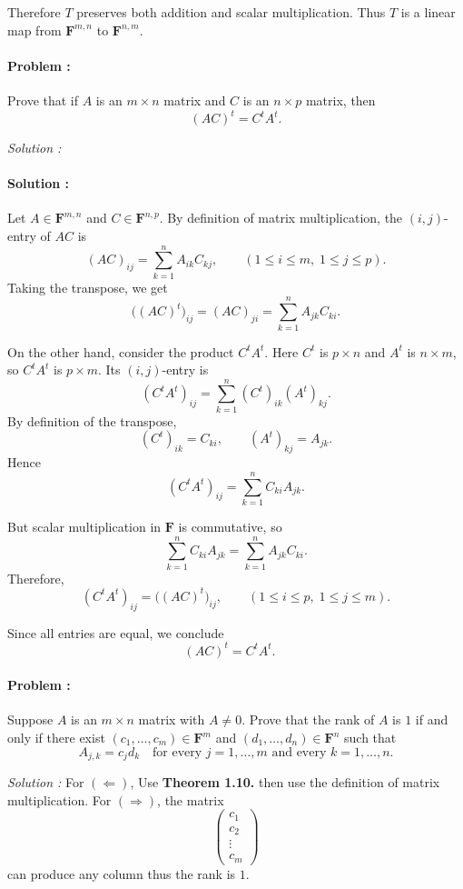 Therefore \(T\) preserves both addition and scalar multiplication.  
Thus \(T\) is a linear map from \(\mathbf{F}^{m,n}\) to \(\mathbf{F}^{n,m}\).

\paragraph{Problem :}
Prove that if \(A\) is an \(m \times n\) matrix and \(C\) is an \(n \times p\) matrix, then
\[
(AC)^t = C^t A^t.
\]

\vspace{4mm}
\textit{Solution :} 
\paragraph{Solution :}
Let \(A \in \mathbf{F}^{m,n}\) and \(C \in \mathbf{F}^{n,p}\).  
By definition of matrix multiplication, the \((i,j)\)-entry of \(AC\) is
\[
(AC)_{ij} = \sum_{k=1}^n A_{ik} C_{kj}, \qquad (1 \leq i \leq m, \; 1 \leq j \leq p).
\]
Taking the transpose, we get
\[
\big((AC)^t\big)_{ij} = (AC)_{ji} 
= \sum_{k=1}^n A_{jk} C_{ki}.
\]

On the other hand, consider the product \(C^t A^t\).  
Here \(C^t\) is \(p \times n\) and \(A^t\) is \(n \times m\), so \(C^t A^t\) is \(p \times m\).  
Its \((i,j)\)-entry is
\[
(C^t A^t)_{ij} = \sum_{k=1}^n (C^t)_{ik} (A^t)_{kj}.
\]
By definition of the transpose,
\[
(C^t)_{ik} = C_{ki}, \qquad (A^t)_{kj} = A_{jk}.
\]
Hence
\[
(C^t A^t)_{ij} = \sum_{k=1}^n C_{ki} A_{jk}.
\]

But scalar multiplication in \(\mathbf{F}\) is commutative, so
\[
\sum_{k=1}^n C_{ki} A_{jk} = \sum_{k=1}^n A_{jk} C_{ki}.
\]
Therefore,
\[
(C^t A^t)_{ij} = \big((AC)^t\big)_{ij}, \qquad (1 \leq i \leq p, \; 1 \leq j \leq m).
\]

Since all entries are equal, we conclude
\[
(AC)^t = C^t A^t. \quad 
\]

\paragraph{Problem :}
Suppose \(A\) is an \(m \times n\) matrix with \(A \neq 0\). Prove that the rank of \(A\) is \(1\) 
if and only if there exist \((c_{1}, \dots, c_{m}) \in \mathbf{F}^m\) and \((d_{1}, \dots, d_{n}) \in \mathbf{F}^n\) such that
\[
A_{j,k} = c_j d_k \quad \text{for every } j = 1, \dots, m \text{ and every } k = 1, \dots, n.
\]

\vspace{4mm}
\textit{Solution :} For $(\Leftarrow)$, Use \textbf{Theorem 1.10.} then use the definition of matrix multiplication.
For $(\Rightarrow)$, the matrix 
\[ \begin{pmatrix}
    c_1 \\ 
    c_2 \\ 
    \vdots \\
    c_m
\end{pmatrix} \]
can produce any column thus the rank is $1$.

